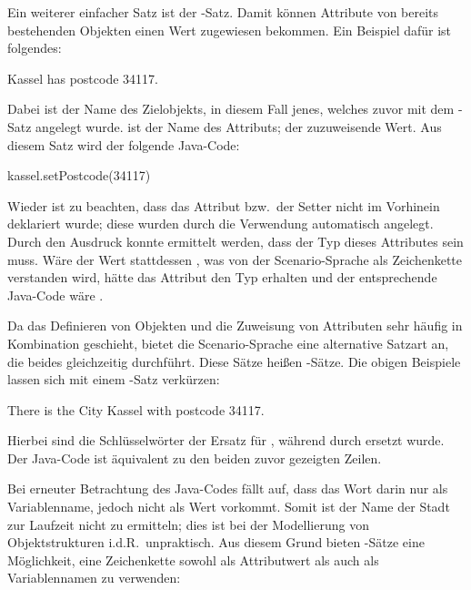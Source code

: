 Ein weiterer einfacher Satz ist der -Satz.
Damit können Attribute von bereits bestehenden Objekten einen Wert zugewiesen bekommen.
Ein Beispiel dafür ist folgendes:

\begin{codeblock}
    Kassel has postcode 34117.
\end{codeblock}

Dabei ist  der Name des Zielobjekts, in diesem Fall jenes, welches zuvor mit dem -Satz angelegt wurde.
 ist der Name des Attributs;  der zuzuweisende Wert.
Aus diesem Satz wird der folgende Java-Code:

\begin{jcodeblock}
    kassel.setPostcode(34117)
\end{jcodeblock}

Wieder ist zu beachten, dass das Attribut  bzw.\ der Setter  nicht im Vorhinein deklariert wurde;
diese wurden durch die Verwendung automatisch angelegt.
Durch den Ausdruck  konnte ermittelt werden, dass der Typ dieses Attributes  sein muss.
Wäre der Wert stattdessen , was von der Scenario-Sprache als Zeichenkette verstanden wird,
hätte das Attribut den Typ  erhalten und der entsprechende Java-Code wäre .

Da das Definieren von Objekten und die Zuweisung von Attributen sehr häufig in Kombination geschieht, bietet die Scenario-Sprache eine alternative Satzart an, die beides gleichzeitig durchführt.
Diese Sätze heißen -Sätze.
Die obigen Beispiele lassen sich mit einem -Satz verkürzen:

\begin{codeblock}
    There is the City Kassel with postcode 34117.
\end{codeblock}

Hierbei sind die Schlüsselwörter  der Ersatz für ,
während  durch  ersetzt wurde.
Der Java-Code ist äquivalent zu den beiden zuvor gezeigten Zeilen.

Bei erneuter Betrachtung des Java-Codes fällt auf, dass das Wort  darin nur als Variablenname, jedoch nicht als Wert vorkommt.
Somit ist der Name der Stadt zur Laufzeit nicht zu ermitteln;
dies ist bei der Modellierung von Objektstrukturen i.d.R.\ unpraktisch.
Aus diesem Grund bieten -Sätze eine Möglichkeit, eine Zeichenkette sowohl als Attributwert als auch als Variablennamen zu verwenden:

